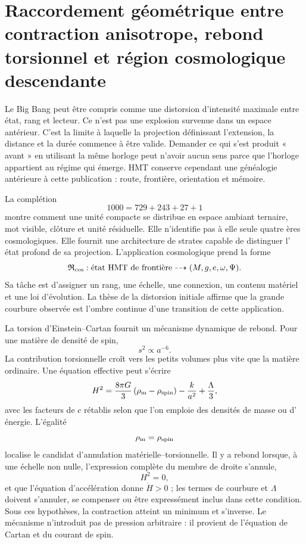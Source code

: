 \section{Raccordement géométrique entre contraction anisotrope, rebond torsionnel et région cosmologique descendante}

Le Big Bang peut être compris comme une distorsion d'intensité maximale entre état,
rang et lecteur. Ce n'est pas une explosion survenue dans un espace antérieur. C'est la
limite à laquelle la projection définissant l'extension, la distance et la durée commence à
être valide. Demander ce qui s'est produit « avant » en utilisant la même horloge peut n'avoir aucun
sens parce que l'horloge appartient au régime qui émerge. HMT conserve cependant
une généalogie antérieure à cette publication : route, frontière, orientation et
mémoire.

La complétion
\[
 1000=729+243+27+1
\]
montre comment une unité compacte se distribue en espace ambiant ternaire, mot
visible, clôture et unité résiduelle. Elle n'identifie pas à elle seule quatre ères
cosmologiques. Elle fournit une architecture de strates capable de distinguer l'
état profond de sa projection. L'application cosmologique prend la forme
\[
 \mathfrak R_{\rm cos}:
 \text{état HMT de frontière}
 \dashrightarrow
 (M,g,e,\omega,\Psi).
\]
Sa tâche est d'assigner un rang, une échelle, une connexion, un contenu matériel et une loi d'évolution.
La thèse de la distorsion initiale affirme que la grande courbure observée est l'ombre
continue d'une transition de cette application.

La torsion d'Einstein--Cartan fournit un mécanisme dynamique de rebond. Pour une
matière de densité de spin,
\[
 s^2\propto a^{-6}.
\]
La contribution torsionnelle croît vers les petits volumes plus vite que la matière
ordinaire. Une équation effective peut s'écrire
\[
 H^2
 =
 \frac{8\pi G}{3}
 \left(\rho_{\rm m}-\rho_{\rm spin}\right)
 -
 \frac{k}{a^2}
 +
 \frac{\Lambda}{3},
\]
avec les facteurs de \(c\) rétablis selon que l'on emploie des densités de masse ou d'
énergie. L'égalité
\[
 \rho_{\rm m}=\rho_{\rm spin}
\]
localise le candidat d'annulation matérielle--torsionnelle. Il y a rebond lorsque, à une
échelle non nulle, l'expression complète du membre de droite s'annule,
\[
 H^2=0,
\]
et que l'équation d'accélération donne \(\dot H>0\) ; les termes de courbure et
\(\Lambda\) doivent s'annuler, se compenser ou être expressément inclus dans cette condition.
Sous ces hypothèses, la contraction atteint un minimum et s'inverse. Le mécanisme
n'introduit pas de pression arbitraire : il provient de l'équation de Cartan et du
courant de spin.

